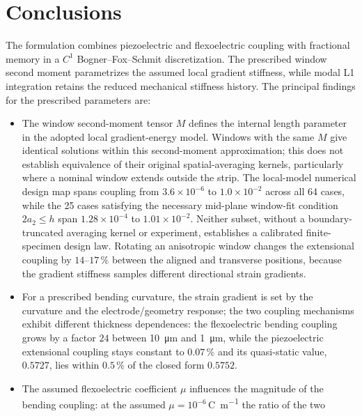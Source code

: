 \FloatBarrier
\section{Conclusions}
\label{sec:conclusions}

The formulation combines piezoelectric and flexoelectric coupling with
fractional memory in a $C^1$ Bogner--Fox--Schmit discretization. The prescribed window second moment parametrizes the assumed local
gradient stiffness, while modal L1
integration retains the reduced mechanical stiffness history. The principal findings for the prescribed parameters are:

\begin{itemize}
\item The window second-moment tensor $M$ defines the internal length
  parameter in the adopted local gradient-energy model. Windows with the same
  $M$ give identical solutions within this second-moment approximation; this
  does not establish equivalence of their original spatial-averaging kernels,
  particularly where a nominal window extends outside the strip. The local-model numerical design map spans coupling from
$3.6\times10^{-6}$ to $1.0\times10^{-2}$ across all 64 cases, while
the 25 cases satisfying the necessary mid-plane window-fit condition
$2a_2\le h$ span $1.28\times10^{-4}$ to $1.01\times10^{-2}$.
Neither subset, without a boundary-truncated averaging kernel or
experiment, establishes a calibrated finite-specimen design law. Rotating an anisotropic window changes the extensional
  coupling by $14$--$17\,\%$ between the aligned and transverse positions,
  because the gradient stiffness samples different directional strain gradients.
\item For a prescribed bending curvature, the strain gradient is set by the
  curvature and the electrode/geometry response; the two coupling mechanisms exhibit different thickness dependences: the
  flexoelectric bending coupling grows by a factor $24$ between
  \SI{10}{\micro\meter} and \SI{1}{\micro\meter}, while the piezoelectric
  extensional coupling stays constant to $0.07\,\%$ and its quasi-static value,
  $0.5727$, lies within $0.5\,\%$ of the closed form $0.5752$.
\item The assumed flexoelectric coefficient $\mu$ influences the magnitude of
  the bending coupling: at
  the assumed $\mu=10^{-6}$\,\si{\coulomb\per\meter} the ratio of the two

\end{itemize}

